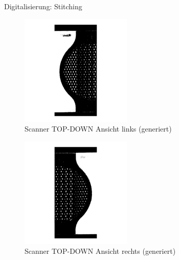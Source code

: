 \documentclass[../slides.tex]{subfiles}
\begin{document}
  \begin{frame}{Digitalisierung: Stitching}
    \begin{minipage}[]{.49\textwidth}
        \begin{figure}[]
            \includegraphics[width=150pt]{img_niklas/scanner_2.png}
            \caption{Scanner TOP-DOWN Ansicht links (generiert)}
            \label{fig:scanner_left}
          \end{figure}
    \end{minipage}
    \hfill
    \begin{minipage}[]{.49\textwidth}
      \begin{figure}[]
        \includegraphics[width=150pt]{img_niklas/scanner_1.png}
        \caption{Scanner TOP-DOWN Ansicht rechts (generiert)}
        \label{fig:scanner_right}
      \end{figure}
    \end{minipage}
  \end{frame}
\end{document}
